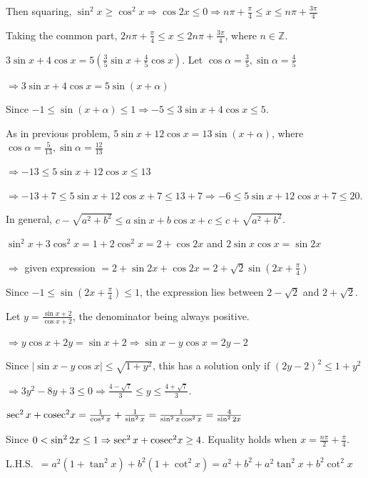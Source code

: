  Then squaring, $\sin^2x\geq \cos^2x\Rightarrow \cos2x\leq 0\Rightarrow n\pi + \frac{\pi}{4}\leq x\leq n\pi
  + \frac{3\pi}{4}$

  Taking the common part, $2n\pi + \frac{\pi}{4}\leq x\leq 2n\pi + \frac{3\pi}{4}$, where $n\in\mathbb{Z}$.
\item $3\sin x + 4\cos x = 5\left(\frac{3}{5}\sin x + \frac{4}{5}\cos x\right)$. Let $\cos\alpha =
  \frac{3}{5}, \sin\alpha = \frac{4}{5}$

  $\Rightarrow 3\sin x + 4\cos x = 5\sin(x + \alpha)$

  Since $-1\leq \sin(x + \alpha)\leq 1\Rightarrow -5\leq 3\sin x + 4\cos x\leq 5$.
\item As in previous problem, $5\sin x + 12\cos x = 13\sin(x + \alpha)$, where $\cos\alpha = \frac{5}{13},
  \sin\alpha = \frac{12}{13}$

  $\Rightarrow -13\leq 5\sin x + 12\cos x\leq 13$

  $\Rightarrow -13 + 7\leq 5\sin x + 12\cos x + 7\leq 13 + 7\Rightarrow -6\leq 5\sin x + 12\cos x + 7\leq
  20$.

  In general, $c - \sqrt{a^2 + b^2}\leq a\sin x + b\cos x + c\leq c + \sqrt{a^2 + b^2}$.
\item $\sin^2x + 3\cos^2x = 1 + 2\cos^2x = 2 + \cos2x$ and $2\sin x\cos x = \sin2x$

  $\Rightarrow$ given expression $= 2 + \sin2x + \cos2x = 2 + \sqrt{2}\sin\left(2x + \frac{\pi}{4}\right)$

  Since $-1\leq \sin\left(2x + \frac{\pi}{4}\right)\leq 1$, the expression lies between $2 - \sqrt{2}$ and $2
  + \sqrt{2}$.
\item Let $y = \frac{\sin x + 2}{\cos x + 2}$, the denominator being always positive.

  $\Rightarrow y\cos x + 2y = \sin x + 2\Rightarrow \sin x - y\cos x = 2y - 2$

  Since $|\sin x - y\cos x|\leq \sqrt{1 + y^2}$, this has a solution only if $(2y - 2)^2\leq 1 + y^2$

  $\Rightarrow 3y^2 - 8y + 3\leq 0\Rightarrow \frac{4 - \sqrt{7}}{3}\leq y\leq \frac{4 + \sqrt{7}}{3}$.
\item $\sec^2x + {\rm cosec}^2x = \frac{1}{\cos^2x} + \frac{1}{\sin^2x} = \frac{1}{\sin^2x\cos^2x} =
  \frac{4}{\sin^22x}$

  Since $0 < \sin^22x\leq 1\Rightarrow \sec^2x + {\rm cosec}^2x\geq 4$. Equality holds when $x = \frac{n\pi}{2}
  + \frac{\pi}{4}$.
\item L.H.S.\ $= a^2(1 + \tan^2x) + b^2(1 + \cot^2x) = a^2 + b^2 + a^2\tan^2x + b^2\cot^2x$

